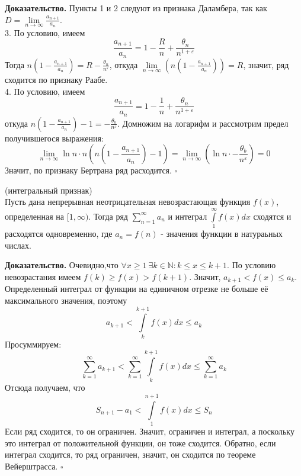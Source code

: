 \textbf{Доказательство.} Пункты 1 и 2 следуют из признака Даламбера,
так как $D=\lim\limits_{n \to \infty}\frac{a_{n+1}}{a_n}$.\\
3. По условию, имеем
$$\frac{a_{n+1}}{a_n}=1-\frac{R}{n}+\frac{\theta_n}{n^{1+\varepsilon}}$$
Тогда $n(1-\frac{a_{n+1}}{a_n})=R-\frac{\theta_n}{n^\varepsilon}$, откуда
$\lim\limits_{n \to \infty}\left(n\left(1-\frac{a_{n+1}}{a_n}\right)\right)=R$,
значит, ряд сходится по признаку Раабе.\\
4. По условию, имеем
$$\frac{a_{n+1}}{a_n}=1-\frac{1}{n}+\frac{\theta_n}{n^{1+\varepsilon}}$$
откуда $n\left( 1-\frac{a_{n+1}}{a_n}\right)-1=
-\frac{\theta_b}{n^\varepsilon}$. Домножим на логарифм и рассмотрим предел
получившегося выражения:
$$\lim\limits_{n \to \infty}
\ln n\cdot n\left(n\left(1-\frac{a_{n+1}}{a_n}\right)-1\right)=
\lim\limits_{n \to \infty}\left(\ln n\cdot 
-\frac{\theta_b}{n^\varepsilon}\right)=0$$
Значит, по признаку Бертрана ряд расходится. $\square$ 
\begin{theor}
    (интегральный признак)\\
    Пусть дана непрерывная неотрицательная невозрастающая функция $f(x)$,
    определенная на $[1,\infty)$. Тогда 
    ряд $\sum\limits_{n=1}^{\infty} a_n$ и интеграл $\int\limits^\infty_1
    f(x)dx$ сходятся и расходятся одновременно, где $a_n=f(n)$ - значения
    функции в натураьных числах.
\end{theor}
\textbf{Доказательство.} Очевидно,что
$\forall x\geqslant1~\exists k\in\mathbb{N}:k\leqslant x\leqslant k+1$.
По условию невозрастания имеем $f(k)\geqslant f(x)>f(k+1)$.
Значит, $a_{k+1}<f(x)\leqslant a_k$. Определенный интеграл от функции 
на единичном отрезке не больше её максимального значения, поэтому
$$a_{k+1}<\int\limits_{k}^{k+1}f(x)dx\leqslant a_k$$ 
Просуммируем: 
$$\sum\limits_{k=1}^{\infty}a_{k+1}<\sum\limits_{k=1}^{\infty}
\int\limits_{k}^{k+1}f(x)dx \leqslant \sum\limits_{k=1}^{\infty} a_k$$
Отсюда получаем, что 
$$S_{n+1}-a_1<\int\limits_{1}^{n+1}f(x)dx\leqslant S_n$$ 
Если ряд сходится, то он ограничен. Значит, ограничен и интеграл, а поскольку
это интеграл от положительной функции, он тоже сходится. Обратно, если 
интеграл сходится, то ряд ограничен, значит, он сходится по теореме 
Вейерштрасса. $\square$


